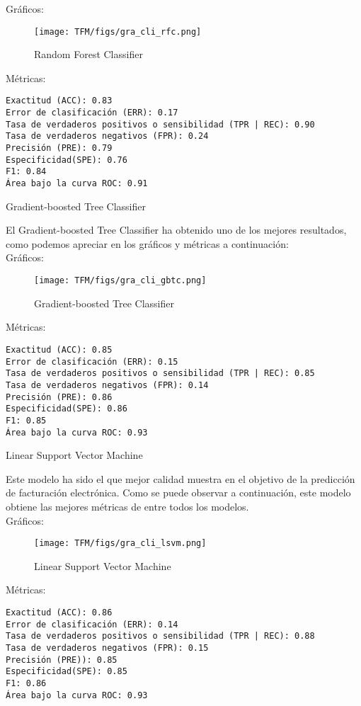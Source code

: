 \begin{itemize}
\begin{minipage}{\linewidth}
Gráficos:
\begin{figure}[H]
\centerline{\texttt{[image: TFM/figs/gra\_cli\_rfc.png]}}
\caption{Random Forest Classifier}
\label{fig:gra_cli_rfc}
\end{figure}
Métricas:
\begin{verbatim}
Exactitud (ACC): 0.83
Error de clasificación (ERR): 0.17
Tasa de verdaderos positivos o sensibilidad (TPR | REC): 0.90
Tasa de verdaderos negativos (FPR): 0.24
Precisión (PRE): 0.79
Especificidad(SPE): 0.76
F1: 0.84
Área bajo la curva ROC: 0.91
\end{verbatim}
\end{minipage}

\begin{minipage}{\linewidth}
    \item Gradient-boosted Tree Classifier
    
El Gradient-boosted Tree Classifier ha obtenido uno de los mejores resultados, como podemos apreciar en los gráficos y métricas a continuación:
\\

Gráficos:
\begin{figure}[H]
\centerline{\texttt{[image: TFM/figs/gra\_cli\_gbtc.png]}}
\caption{Gradient-boosted Tree Classifier}
\label{fig:gra_cli_gbtc}
\end{figure}
Métricas:
\begin{verbatim}
Exactitud (ACC): 0.85
Error de clasificación (ERR): 0.15
Tasa de verdaderos positivos o sensibilidad (TPR | REC): 0.85
Tasa de verdaderos negativos (FPR): 0.14
Precisión (PRE): 0.86
Especificidad(SPE): 0.86
F1: 0.85
Área bajo la curva ROC: 0.93
\end{verbatim}
\end{minipage}

\begin{minipage}{\linewidth}
    \item Linear Support Vector Machine

Este modelo ha sido el que mejor calidad muestra en el objetivo de la predicción de facturación electrónica.
Como se puede observar a continuación, este modelo obtiene las mejores métricas de entre todos los modelos.
\\

Gráficos:
\begin{figure}[H]
\centerline{\texttt{[image: TFM/figs/gra\_cli\_lsvm.png]}}
\caption{Linear Support Vector Machine}
\label{fig:gra_cli_lsvm}
\end{figure}
Métricas:
\begin{verbatim}
Exactitud (ACC): 0.86
Error de clasificación (ERR): 0.14
Tasa de verdaderos positivos o sensibilidad (TPR | REC): 0.88
Tasa de verdaderos negativos (FPR): 0.15
Precisión (PRE)): 0.85
Especificidad(SPE): 0.85
F1: 0.86
Área bajo la curva ROC: 0.93
\end{verbatim}
\end{minipage}

\end{itemize}
\clearpage


